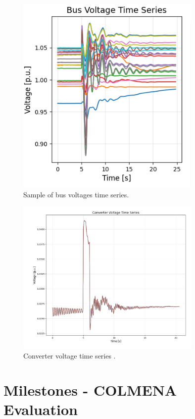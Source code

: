 \documentclass{article}
\begin{document}
\begin{figure}[ht]
\centering
\includegraphics[width=0.8\textwidth]{figures/bus_voltage.png} %
\caption{Sample of bus voltages time series.}
\label{fig:bus_v}
\end{figure}

\begin{figure}[ht]
\centering
\includegraphics[width=0.8\textwidth]{figures/converter.png} %
\caption{Converter voltage time series .}
\label{fig:bus_v}
\end{figure}

\section{Milestones - COLMENA Evaluation}
\end{document}
